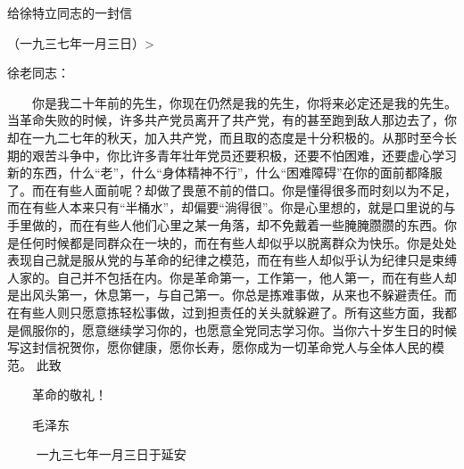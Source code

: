 给徐特立同志的一封信

（一九三七年一月三日）>



徐老同志：

　　你是我二十年前的先生，你现在仍然是我的先生，你将来必定还是我的先生。当革命失败的时候，许多共产党员离开了共产党，有的甚至跑到敌人那边去了，你却在一九二七年的秋天，加入共产党，而且取的态度是十分积极的。从那时至今长期的艰苦斗争中，你比许多青年壮年党员还要积极，还要不怕困难，还要虚心学习新的东西，什么“老”，什么“身体精神不行”，什么“困难障碍”在你的面前都降服了。而在有些人面前呢？却做了畏葸不前的借口。你是懂得很多而时刻以为不足，而在有些人本来只有“半桶水”，却偏要“淌得很”。你是心里想的，就是口里说的与手里做的，而在有些人他们心里之某一角落，却不免戴着一些腌腌臜臜的东西。你是任何时候都是同群众在一块的，而在有些人却似乎以脱离群众为快乐。你是处处表现自己就是服从党的与革命的纪律之模范，而在有些人却似乎认为纪律只是束缚人家的。自己并不包括在内。你是革命第一，工作第一，他人第一，而在有些人却是出风头第一，休息第一，与自己第一。你总是拣难事做，从来也不躲避责任。而在有些人则只愿意拣轻松事做，过到担责任的关头就躲避了。所有这些方面，我都是佩服你的，愿意继续学习你的，也愿意全党同志学习你。当你六十岁生日的时候写这封信祝贺你，愿你健康，愿你长寿，愿你成为一切革命党人与全体人民的模范。
        此致

　　革命的敬礼！


　　毛泽东

　　        一九三七年一月三日于延安